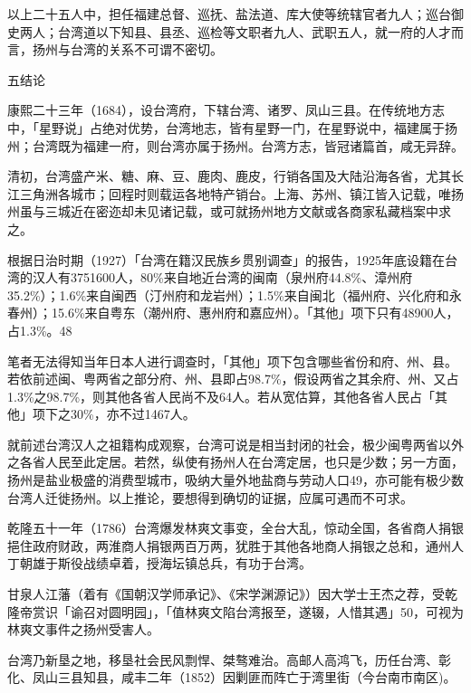 以上二十五人中，担任福建总督、巡抚、盐法道、库大使等统辖官者九人；巡台御史两人；台湾道以下知县、县丞、巡检等文职者九人、武职五人，就一府的人才而言，扬州与台湾的关系不可谓不密切。

五结论

康熙二十三年（1684），设台湾府，下辖台湾、诸罗、凤山三县。在传统地方志中，「星野说」占绝对优势，台湾地志，皆有星野一门，在星野说中，福建属于扬州；台湾既为福建一府，则台湾亦属于扬州。台湾方志，皆冠诸篇首，咸无异辞。

清初，台湾盛产米、糖、麻、豆、鹿肉、鹿皮，行销各国及大陆沿海各省，尤其长江三角洲各城市；回程时则载运各地特产销台。上海、苏州、镇江皆入记载，唯扬州虽与三城近在密迩却未见诸记载，或可就扬州地方文献或各商家私藏档案中求之。

\vfill
\begin{BookNotes}
\end{BookNotes}

根据日治时期（1927）「台湾在籍汉民族乡贯别调查」的报告，1925年底设籍在台湾的汉人有3751600人，80\%来自地近台湾的闽南（泉州府44.8\%、漳州府35.2\%）；1.6\%来自闽西（汀州府和龙岩州）；1.5\%来自闽北（福州府、兴化府和永春州）；15.6\%来自粤东（潮州府、惠州府和嘉应州）。「其他」项下只有48900人，占1.3\%。48

笔者无法得知当年日本人进行调查时，「其他」项下包含哪些省份和府、州、县。若依前述闽、粤两省之部分府、州、县即占98.7\%，假设两省之其余府、州、又占1.3\%之98.7\%，则其他各省人民尚不及64人。若从宽估算，其他各省人民占「其他」项下之30\%，亦不过1467人。

就前述台湾汉人之祖籍构成观察，台湾可说是相当封闭的社会，极少闽粤两省以外之各省人民至此定居。若然，纵使有扬州人在台湾定居，也只是少数；另一方面，扬州是盐业极盛的消费型城市，吸纳大量外地盐商与劳动人口49，亦可能有极少数台湾人迁徙扬州。以上推论，要想得到确切的证据，应属可遇而不可求。

乾隆五十一年（1786）台湾爆发林爽文事变，全台大乱，惊动全国，各省商人捐银挹住政府财政，两淮商人捐银两百万两，犹胜于其他各地商人捐银之总和，通州人丁朝雄于斯役战绩卓着，授海坛镇总兵，有功于台湾。

甘泉人江藩（着有《国朝汉学师承记》、《宋学渊源记》）因大学士王杰之荐，受乾隆帝赏识「谕召对圆明园」，「值林爽文陷台湾报至，遂辍，人惜其遇」50，可视为林爽文事件之扬州受害人。

台湾乃新垦之地，移垦社会民风剽悍、桀骜难治。高邮人高鸿飞，历任台湾、彰化、凤山三县知县，咸丰二年（1852）因剿匪而阵亡于湾里街（今台南市南区)。

